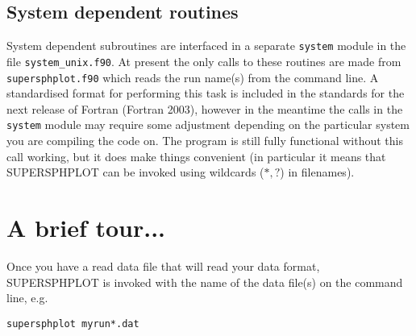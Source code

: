 \documentclass[a4paper,12pt]{article}
\begin{document}
\subsection{System dependent routines}
 System dependent subroutines are interfaced in a separate \verb+system+ module in the file \verb+system_unix.f90+.
At present the only calls to these routines are made from \verb+supersphplot.f90+ which
reads the run name(s) from the command line. A standardised format for performing this
task is included in the standards for the next release of Fortran (Fortran 2003),
however in the meantime the calls in the \verb+system+ module may require some adjustment depending on the
particular system you are compiling the code on. The program is still fully
functional without this call working, but it does make things convenient (in particular it means that
SUPERSPHPLOT can be invoked using wildcards ($*,?$) in filenames).

\section{A brief tour...}
 Once you have a read data file that will read your data format,
SUPERSPHPLOT is invoked with the name of the data
file(s) on the command line, e.g.
\begin{verbatim}
supersphplot myrun*.dat
\end{verbatim}
\end{document}
